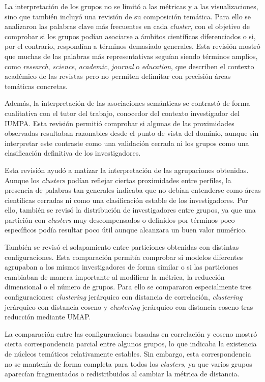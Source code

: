 \documentclass[11pt,spanish,listoffigures,listoftables]{tfgetsinf}
\begin{document}
La interpretación de los grupos no se limitó a las métricas y a las visualizaciones, sino que también incluyó una revisión de su composición temática. Para ello se analizaron las palabras clave más frecuentes en cada \textit{cluster}, con el objetivo de comprobar si los grupos podían asociarse a ámbitos científicos diferenciados o si, por el contrario, respondían a términos demasiado generales. Esta revisión mostró que muchas de las palabras más representativas seguían siendo términos amplios, como \textit{research}, \textit{science}, \textit{academic}, \textit{journal} o \textit{education}, que describen el contexto académico de las revistas pero no permiten delimitar con precisión áreas temáticas concretas.

Además, la interpretación de las asociaciones semánticas se contrastó de forma cualitativa con el tutor del trabajo, conocedor del contexto investigador del IUMPA. Esta revisión permitió comprobar si algunas de las proximidades observadas resultaban razonables desde el punto de vista del dominio, aunque sin interpretar este contraste como una validación cerrada ni los grupos como una clasificación definitiva de los investigadores.

Esta revisión ayudó a matizar la interpretación de las agrupaciones obtenidas. Aunque los \textit{clusters} podían reflejar ciertas proximidades entre perfiles, la presencia de palabras tan generales indicaba que no debían entenderse como áreas científicas cerradas ni como una clasificación estable de los investigadores. Por ello, también se revisó la distribución de investigadores entre grupos, ya que una partición con \textit{clusters} muy descompensados o definidos por términos poco específicos podía resultar poco útil aunque alcanzara un buen valor numérico.

También se revisó el solapamiento entre particiones obtenidas con distintas configuraciones. Esta comparación permitía comprobar si modelos diferentes agrupaban a los mismos investigadores de forma similar o si las particiones cambiaban de manera importante al modificar la métrica, la reducción dimensional o el número de grupos. Para ello se compararon especialmente tres configuraciones: \textit{clustering} jerárquico con distancia de correlación, \textit{clustering} jerárquico con distancia coseno y \textit{clustering} jerárquico con distancia coseno tras reducción mediante UMAP.

La comparación entre las configuraciones basadas en correlación y coseno mostró cierta correspondencia parcial entre algunos grupos, lo que indicaba la existencia de núcleos temáticos relativamente estables. Sin embargo, esta correspondencia no se mantenía de forma completa para todos los \textit{clusters}, ya que varios grupos aparecían fragmentados o redistribuidos al cambiar la métrica de distancia.
\end{document}
